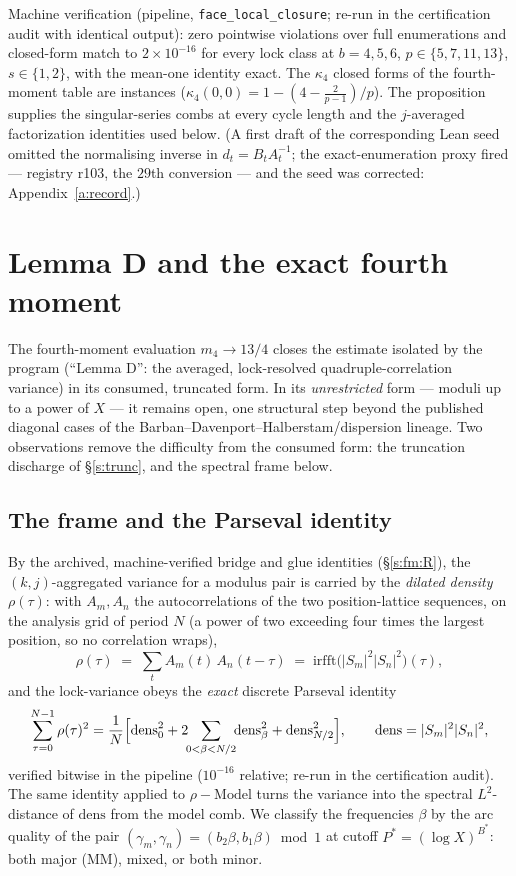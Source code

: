 \documentclass[11pt]{article}
\numberwithin{equation}{section}
\theoremstyle{definition}
\theoremstyle{remark}
\begin{document}
Machine verification (pipeline, \texttt{face\_local\_closure};
re-run in the certification audit with identical output): zero pointwise
violations over full enumerations and closed-form match to
$2\times10^{-16}$ for every lock class at $b=4,5,6$,
$p\in\{5,7,11,13\}$, $s\in\{1,2\}$, with the mean-one identity
exact. The $\kappa_4$ closed forms of the fourth-moment table are
instances ($\kappa_4(0,0)=1-(4-\tfrac2{p-1})/p$). The proposition
supplies the singular-series combs at every cycle length and the
$j$-averaged factorization identities used below. (A first draft
of the corresponding Lean seed omitted the normalising inverse in
$d_t=B_tA_t^{-1}$; the exact-enumeration proxy fired --- registry
r103, the $29$th conversion --- and the seed was corrected:
Appendix~\ref{a:record}.)

\section{Lemma D and the exact fourth moment}\label{s:four}

The fourth-moment evaluation $m_4\to13/4$ closes the estimate
isolated by the program (``Lemma D'': the averaged, lock-resolved
quadruple-correlation variance) in its consumed, truncated form.
In its \emph{unrestricted} form --- moduli up to a power of $X$
--- it remains open, one structural step beyond the published
diagonal cases of the Barban--Davenport--Halberstam/dispersion
lineage. Two observations remove the difficulty from the consumed
form: the truncation discharge of \S\ref{s:trunc}, and the
spectral frame below.

\subsection{The frame and the Parseval identity}

By the archived, machine-verified bridge and glue identities
(\S\ref{s:fm:R}), the $(k,j)$-aggregated variance for a modulus
pair is carried by the \emph{dilated density} $\rho(\tau)$: with
$A_m,A_n$ the autocorrelations of the two position-lattice
sequences, on the analysis grid of period $N$ (a power of two
exceeding four times the largest position, so no correlation
wraps),
\[
\rho(\tau)\;=\;\sum_{t}A_m(t)\,A_n(t-\tau)
\;=\;\mathrm{irfft}\bigl(|S_m|^{2}|S_n|^{2}\bigr)(\tau),
\]
and the lock-variance obeys the \emph{exact} discrete Parseval
identity
\begin{equation}\label{e:pars}
\sum_{\tau=0}^{N-1}\rho(\tau)^{2}
=\frac1N\Bigl[\mathrm{dens}_0^{2}
+2\!\!\sum_{0<\beta<N/2}\!\!\mathrm{dens}_\beta^{2}
+\mathrm{dens}_{N/2}^{2}\Bigr],
\qquad \mathrm{dens}=|S_m|^{2}|S_n|^{2},
\end{equation}
verified bitwise in the pipeline ($10^{-16}$ relative; re-run in
the certification audit). The same identity applied to
$\rho-\mathrm{Model}$ turns the variance into the spectral
$L^{2}$-distance of $\mathrm{dens}$ from the model comb. We
classify the frequencies $\beta$ by the arc quality of the pair
$(\gamma_m,\gamma_n)=(b_2\beta,b_1\beta)\bmod1$ at cutoff
$P^{*}=(\log X)^{B^{*}}$: both major (MM), mixed, or both minor.
\end{document}
